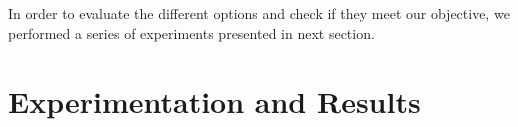 \documentclass[runningheads,a4paper]{llncs}
\begin{document}




In order to evaluate the different options and check if they meet our
objective, we performed a series of experiments presented in next
section. 

\section{Experimentation and Results}\label{ch:res}
\end{document}
